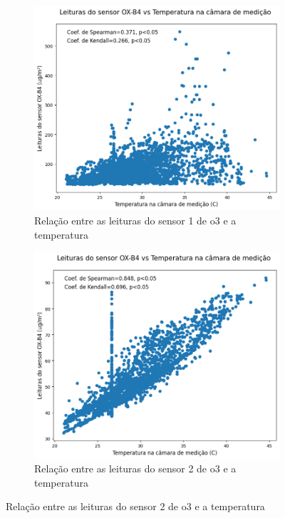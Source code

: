\begin{figure}[h]
    \centering
    \caption{Relação entre as leituras dos sensores de \acrshort{o3} e a temperatura}
    \begin{subfigure}{0.495\textwidth}
        \includegraphics[width=\textwidth]{chapters/3-RESULTADOS CAMPO/Figuras/temperature-o3-b4-1.png}
        \caption{Relação entre as leituras do sensor 1 de \acrshort{o3} e a temperatura}
        \label{fig:data-temp-o3-1-corr}    
    \end{subfigure}
    \hfil
    \begin{subfigure}{0.495\textwidth}
        \includegraphics[width=\textwidth]{chapters/3-RESULTADOS CAMPO/Figuras/temperature-o3-b4-2.png}
        \caption{Relação entre as leituras do sensor 2 de \acrshort{o3} e a temperatura}
        \label{fig:data-temp-o3-2-corr}    
    \end{subfigure}
    \label{fig:data-temp-o3-corr}  
\end{figure}

